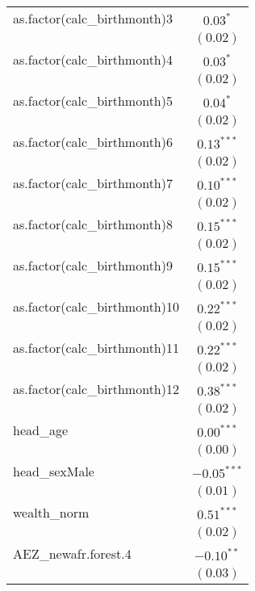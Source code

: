 \begin{longtable}{l c}
as.factor(calc\_birthmonth)3     & $0.03^{*}$     \\
                                 & $(0.02)$       \\
as.factor(calc\_birthmonth)4     & $0.03^{*}$     \\
                                 & $(0.02)$       \\
as.factor(calc\_birthmonth)5     & $0.04^{*}$     \\
                                 & $(0.02)$       \\
as.factor(calc\_birthmonth)6     & $0.13^{***}$   \\
                                 & $(0.02)$       \\
as.factor(calc\_birthmonth)7     & $0.10^{***}$   \\
                                 & $(0.02)$       \\
as.factor(calc\_birthmonth)8     & $0.15^{***}$   \\
                                 & $(0.02)$       \\
as.factor(calc\_birthmonth)9     & $0.15^{***}$   \\
                                 & $(0.02)$       \\
as.factor(calc\_birthmonth)10    & $0.22^{***}$   \\
                                 & $(0.02)$       \\
as.factor(calc\_birthmonth)11    & $0.22^{***}$   \\
                                 & $(0.02)$       \\
as.factor(calc\_birthmonth)12    & $0.38^{***}$   \\
                                 & $(0.02)$       \\
head\_age                        & $0.00^{***}$   \\
                                 & $(0.00)$       \\
head\_sexMale                    & $-0.05^{***}$  \\
                                 & $(0.01)$       \\
wealth\_norm                     & $0.51^{***}$   \\
                                 & $(0.02)$       \\
AEZ\_newafr.forest.4             & $-0.10^{**}$   \\
                                 & $(0.03)$       \\

\end{longtable}
